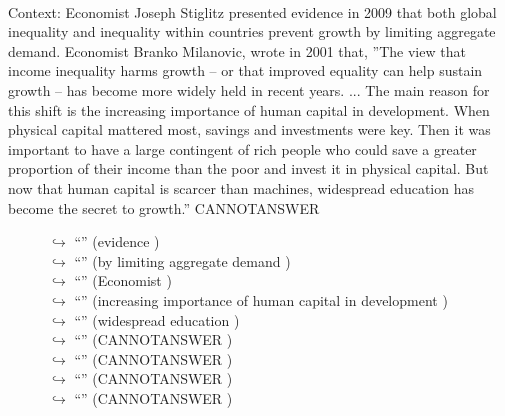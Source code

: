 \documentclass[11pt,a4paper, onecolumn]{article}
\begin{document}
\\ Context: Economist Joseph Stiglitz presented evidence in 2009 that both global inequality and inequality within countries prevent growth by limiting aggregate demand. Economist Branko Milanovic, wrote in 2001 that, ''The view that income inequality harms growth – or that improved equality can help sustain growth – has become more widely held in recent years. ... The main reason for this shift is the increasing importance of human capital in development. When physical capital mattered most, savings and investments were key. Then it was important to have a large contingent of rich people who could save a greater proportion of their income than the poor and invest it in physical capital. But now that human capital is scarcer than machines, widespread education has become the secret to growth.'' CANNOTANSWER

\begin{figure}[t] \small \begin{tcolorbox}[boxsep=0pt,left=5pt,right=0pt,top=2pt,colback = yellow!5] \begin{dialogue}
 \small 
\colorbox{pink!25}{$\hookrightarrow$}
{ ``'' (evidence ) }
\\
\colorbox{pink!25}{$\hookrightarrow$}
{ ``'' (by limiting aggregate demand ) }
\\
\colorbox{pink!25}{$\hookrightarrow$}
{ ``'' (Economist ) }
\\
\colorbox{pink!25}{$\hookrightarrow$}
{ ``'' (increasing importance of human capital in development ) }
\\
\colorbox{pink!25}{$\hookrightarrow$}
{ ``'' (widespread education ) }
\\
\colorbox{pink!25}{$\hookrightarrow$}
{ ``'' (CANNOTANSWER ) }
\\
\colorbox{pink!25}{$\hookrightarrow$}
{ ``'' (CANNOTANSWER ) }
\\
\colorbox{pink!25}{$\hookrightarrow$}
{ ``'' (CANNOTANSWER ) }
\\
\colorbox{pink!25}{$\hookrightarrow$}
{ ``'' (CANNOTANSWER ) }
\\
 \end{dialogue}\end{tcolorbox}\end{figure}
\end{document}
